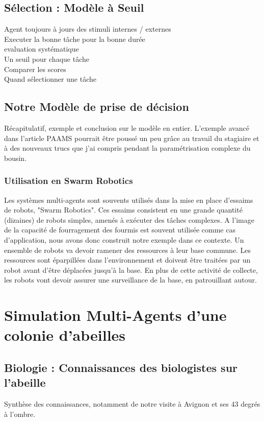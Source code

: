 \documentclass[11pt,a4paper]{article}
\begin{document}
	\subsection{Sélection : Modèle à Seuil}
		Agent toujours à jours des stimuli internes / externes\\
		Executer la bonne tâche pour la bonne durée\\
		
		evaluation systématique\\
		Un seuil pour chaque tâche\\
		Comparer les scores\\
		Quand sélectionner une tâche\\
		
	\subsection{Notre Modèle de prise de décision}
		Récapitulatif, exemple et conclusion sur le modèle en entier.
		L'exemple avancé dans l'article PAAMS pourrait être poussé un peu grâce au travail du stagiaire et à des nouveaux trucs que j'ai compris pendant la paramétrisation complexe du bousin.
		
		\subsubsection{Utilisation en Swarm Robotics}
			Les systèmes multi-agents sont souvents utilisés dans la mise en place d'essaims de robots, "Swarm Robotics". Ces essaims consistent en une grande quantité (dizaines) de robots simples, amenés à exécuter des tâches complexes. A l'image de la capacité de fourragement des fourmis est souvent utilisée comme cas d'application, nous avons donc construit notre exemple dans ce contexte. Un ensemble de robots va devoir ramener des ressources à leur base commune. Les ressources sont éparpillées dans l'environnement et doivent être traitées par un robot avant d'être déplacées jusqu'à la base. En plus de cette activité de collecte, les robots vont devoir assurer une surveillance de la base, en patrouillant autour.
			
\section{Simulation Multi-Agents d'une colonie d'abeilles}
	\subsection{Biologie : Connaissances des biologistes sur l'abeille}
		Synthèse des connaissances, notamment de notre visite à Avignon et ses 43 degrés à l'ombre.\\
		
\end{document}

